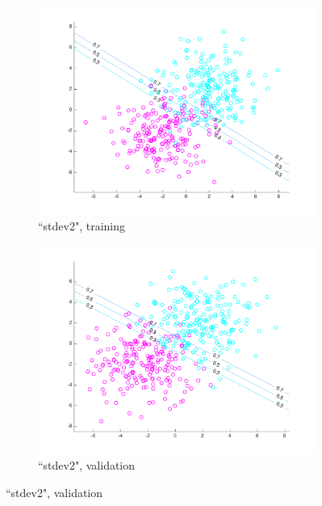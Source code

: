 \begin{figure}[h!]
\begin{subfigure}[b]{0.22\textwidth}
	\includegraphics[scale=0.25]{hw2_1_stdev2_a_0.pdf}
	\caption{``stdev2", training}\label{fig:data_stdev2a}
	\end{subfigure}
	\quad	
	\begin{subfigure}[b]{0.22\textwidth}
	\includegraphics[scale=0.25]{hw2_1_stdev2_b_0.pdf}
	\caption{``stdev2", validation}\label{fig:data_stdev2b}
	\end{subfigure}
    

\end{figure}
